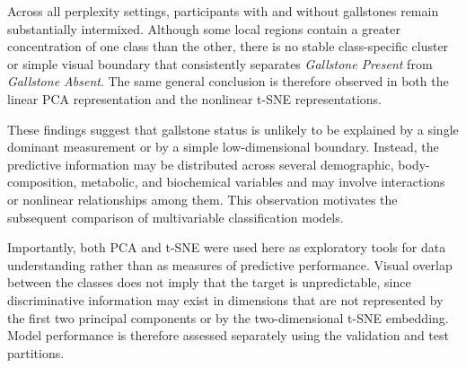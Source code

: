Across all perplexity settings, participants with and without gallstones remain
substantially intermixed. Although some local regions contain a greater
concentration of one class than the other, there is no stable class-specific
cluster or simple visual boundary that consistently separates
\textit{Gallstone Present} from \textit{Gallstone Absent}. The same general
conclusion is therefore observed in both the linear PCA representation and the
nonlinear t-SNE representations.


These findings suggest that gallstone status is unlikely to be explained by a
single dominant measurement or by a simple low-dimensional boundary. Instead,
the predictive information may be distributed across several demographic,
body-composition, metabolic, and biochemical variables and may involve
interactions or nonlinear relationships among them. This observation motivates
the subsequent comparison of multivariable classification models.

Importantly, both PCA and t-SNE were used here as exploratory tools for data
understanding rather than as measures of predictive performance. Visual overlap
between the classes does not imply that the target is unpredictable, since
discriminative information may exist in dimensions that are not represented by
the first two principal components or by the two-dimensional t-SNE embedding.
Model performance is therefore assessed separately using the validation and test
partitions.